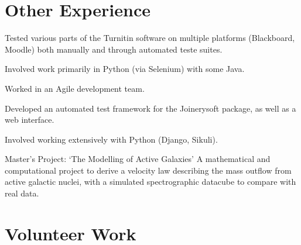 \documentclass[letterpaper]{deedy-resume} %
\begin{document}
\begin{minipage}[t]{0.66\textwidth}
\sectionspace %


\section{Other Experience}


\begin{tightitemize}
\item Tested various parts of the Turnitin software on multiple platforms (Blackboard, Moodle) both manually and through automated teste suites.
\item Involved work primarily in Python (via Selenium) with some Java.
\item Worked in an Agile development team.
\end{tightitemize}

\sectionspace %




\begin{tightitemize}
\item Developed an automated test framework for the Joinerysoft package, as well as a web interface.
\item Involved working extensively with Python (Django, Sikuli).
\end{tightitemize}

\sectionspace %



\begin{tightitemize}
\item Master's Project: `The Modelling of Active Galaxies' A mathematical and computational project to derive a velocity law describing the mass outflow from active galactic nuclei, with a simulated spectrographic datacube to compare with real data.
\end{tightitemize}

\section{Volunteer Work} 


\end{minipage}
\end{document}
